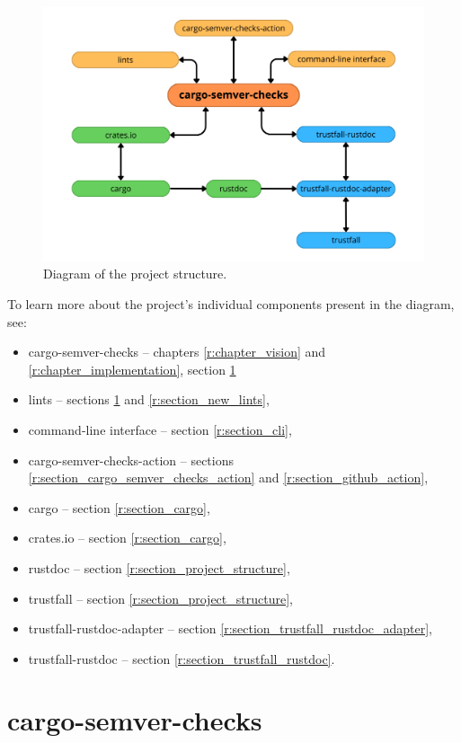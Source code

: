 \documentclass[licencjacka,en]{pracamgr}
\begin{document}
\begin{figure}[h]
	\centering
	\includegraphics[width=\linewidth]{project-structure-diagram.png}
	\caption{Diagram of the project structure.}
\end{figure}

To learn more about the project's individual components present in the diagram, see:
\begin{itemize}
	\item cargo-semver-checks -- chapters \ref{r:chapter_vision} and \ref{r:chapter_implementation},
		section \ref{r:section_cargo_semver_checks}
	\item lints -- sections \ref{r:section_cargo_semver_checks} and \ref{r:section_new_lints},
	\item command-line interface -- section \ref{r:section_cli},
	\item cargo-semver-checks-action -- sections \ref{r:section_cargo_semver_checks_action}
		and \ref{r:section_github_action},
	\item cargo -- section \ref{r:section_cargo},
	\item crates.io -- section \ref{r:section_cargo},
	\item rustdoc -- section \ref{r:section_project_structure},
	\item trustfall -- section \ref{r:section_project_structure},
	\item trustfall-rustdoc-adapter -- section \ref{r:section_trustfall_rustdoc_adapter},
	\item trustfall-rustdoc -- section \ref{r:section_trustfall_rustdoc}.
\end{itemize}

\section{cargo-semver-checks}\label{r:section_cargo_semver_checks}
\end{document}
